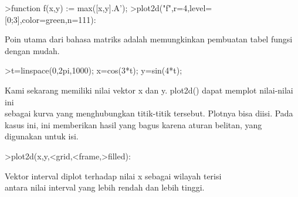 \documentclass[a4paper,10pt]{article}
\begin{document}
\begin{eulernotebook}
\begin{eulercomment}
\begin{eulercomment}
\begin{eulercomment}
\begin{eulercomment}
\begin{eulercomment}
\begin{eulercomment}
\begin{eulerprompt}
>function f(x,y) := max([x,y].A');
>plot2d("f",r=4,level=[0;3],color=green,n=111):
\end{eulerprompt}
\begin{eulercomment}
Poin utama dari bahasa matriks adalah memungkinkan pembuatan tabel
fungsi dengan mudah.
\end{eulercomment}
\begin{eulerprompt}
>t=linspace(0,2pi,1000); x=cos(3*t); y=sin(4*t);
\end{eulerprompt}
\begin{eulercomment}
Kami sekarang memiliki nilai vektor x dan y. plot2d() dapat memplot
nilai-nilai ini\\
sebagai kurva yang menghubungkan titik-titik tersebut. Plotnya bisa
diisi. Pada kasus ini, ini memberikan hasil yang bagus karena aturan
belitan, yang digunakan untuk isi.
\end{eulercomment}
\begin{eulerprompt}
>plot2d(x,y,<grid,<frame,>filled):
\end{eulerprompt}
\begin{eulercomment}
Vektor interval diplot terhadap nilai x sebagai wilayah terisi\\
antara nilai interval yang lebih rendah dan lebih tinggi.


\end{eulercomment}
\end{eulercomment}
\end{eulercomment}
\end{eulercomment}
\end{eulercomment}
\end{eulercomment}
\end{eulercomment}
\end{eulernotebook}
\end{document}
